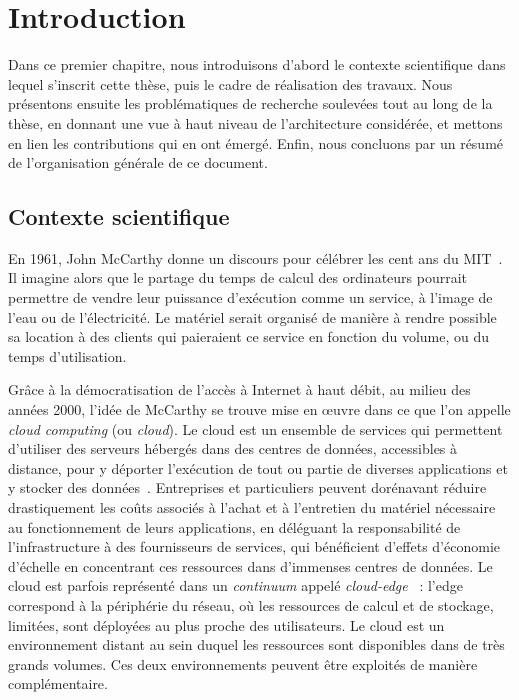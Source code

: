 \chapter{Introduction}
\label{chapter:introduction}

Dans ce premier chapitre, nous introduisons d'abord le contexte scientifique dans lequel s'inscrit cette thèse, puis le cadre de réalisation des travaux. Nous présentons ensuite les problématiques de recherche soulevées tout au long de la thèse, en donnant une vue à haut niveau de l'architecture considérée, et mettons en lien les contributions qui en ont émergé. Enfin, nous concluons par un résumé de l'organisation générale de ce document.

\section{Contexte scientifique}

En 1961, John McCarthy donne un discours pour célébrer les cent ans du MIT~\cite{greenberger1962management}. Il imagine alors que le partage du temps de calcul des ordinateurs pourrait permettre de vendre leur puissance d'exécution comme un service, à l'image de l'eau ou de l'électricité. Le matériel serait organisé de manière à rendre possible sa location à des clients qui paieraient ce service en fonction du volume, ou du temps d'utilisation.

Grâce à la démocratisation de l'accès à Internet à haut débit, au milieu des années 2000, l'idée de McCarthy se trouve mise en œuvre dans ce que l'on appelle \textit{cloud computing} (ou \textit{cloud}). Le cloud est un ensemble de services qui permettent d'utiliser des serveurs hébergés dans des centres de données, accessibles à distance, pour y déporter l'exécution de tout ou partie de diverses applications et y stocker des données~\cite{hayesCloudComputing2008}. Entreprises et particuliers peuvent dorénavant réduire drastiquement les coûts associés à l'achat et à l'entretien du matériel nécessaire au fonctionnement de leurs applications, en déléguant la responsabilité de l'infrastructure à des fournisseurs de services, qui bénéficient d'effets d'économie d'échelle en concentrant ces ressources dans d'immenses centres de données. Le cloud est parfois représenté dans un \textit{continuum} appelé \textit{cloud-edge}~\cite{jansenSPECRGReferenceArchitecture2023} : l'edge correspond à la périphérie du réseau, où les ressources de calcul et de stockage, limitées, sont déployées au plus proche des utilisateurs. Le cloud est un environnement distant au sein duquel les ressources sont disponibles dans de très grands volumes. Ces deux environnements peuvent être exploités de manière complémentaire.

